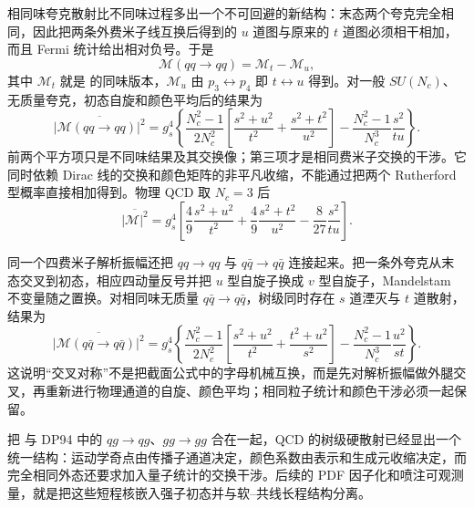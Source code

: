 相同味夸克散射比不同味过程多出一个不可回避的新结构：末态两个夸克完全相同，因此把两条外费米子线互换后得到的 $u$ 道图与原来的 $t$ 道图必须相干相加，而且 Fermi 统计给出相对负号。于是
\begin{equation}
{
\mathcal M(qq\to qq)=\mathcal M_t-\mathcal M_u,}
\label{eq:qcd-identical-qq-amplitude-dp95}
\end{equation}
其中 $\mathcal M_t$ 就是 的同味版本，$\mathcal M_u$ 由 $p_3\leftrightarrow p_4$ 即 $t\leftrightarrow u$ 得到。对一般 $SU(N_c)$、无质量夸克，初态自旋和颜色平均后的结果为
\begin{equation}
{
\overline{|\mathcal M(qq\to qq)|^2}
=g_s^4\left\{
\frac{N_c^2-1}{2N_c^2}
\left[\frac{s^2+u^2}{t^2}+\frac{s^2+t^2}{u^2}\right]
-\frac{N_c^2-1}{N_c^3}\frac{s^2}{tu}
\right\}.}
\label{eq:qcd-identical-qq-m2-dp95}
\end{equation}
前两个平方项只是不同味结果及其交换像；第三项才是相同费米子交换的干涉。它同时依赖 Dirac 线的交换和颜色矩阵的非平凡收缩，不能通过把两个 Rutherford 型概率直接相加得到。物理 QCD 取 $N_c=3$ 后
\begin{equation*}
\overline{|\mathcal M|^2}
=g_s^4\left[
\frac49\frac{s^2+u^2}{t^2}
+\frac49\frac{s^2+t^2}{u^2}
-\frac{8}{27}\frac{s^2}{tu}
\right].
\end{equation*}

同一个四费米子解析振幅还把 $qq\to qq$ 与 $q\bar q\to q\bar q$ 连接起来。把一条外夸克从末态交叉到初态，相应四动量反号并把 $u$ 型自旋子换成 $v$ 型自旋子，Mandelstam 不变量随之置换。对相同味无质量 $q\bar q\to q\bar q$，树级同时存在 $s$ 道湮灭与 $t$ 道散射，结果为
\begin{equation}
{
\overline{|\mathcal M(q\bar q\to q\bar q)|^2}
=g_s^4\left\{
\frac{N_c^2-1}{2N_c^2}
\left[\frac{s^2+u^2}{t^2}+\frac{t^2+u^2}{s^2}\right]
-\frac{N_c^2-1}{N_c^3}\frac{u^2}{st}
\right\}.}
\label{eq:qcd-identical-qqbar-m2-dp95}
\end{equation}
这说明“交叉对称”不是把截面公式中的字母机械互换，而是先对解析振幅做外腿交叉，再重新进行物理通道的自旋、颜色平均；相同粒子统计和颜色干涉必须一起保留。

把 与 DP94 中的 $qg\to qg$、$gg\to gg$ 合在一起，QCD 的树级硬散射已经显出一个统一结构：运动学奇点由传播子通道决定，颜色系数由表示和生成元收缩决定，而完全相同外态还要求加入量子统计的交换干涉。后续的 PDF 因子化和喷注可观测量，就是把这些短程核嵌入强子初态并与软--共线长程结构分离。
